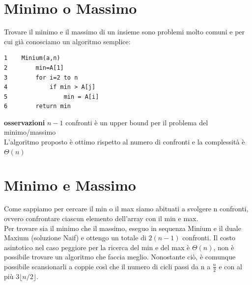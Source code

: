 \section{Minimo o Massimo}
Trovare il minimo e il massimo di un insieme sono problemi molto comuni e per cui già conosciamo un algoritmo semplice: 
\begin{verbatim}
1    Minium(a,n)
2        min=A[1]
3        for i=2 to n
4            if min > A[j]
5                min = A[i]
6        return min
\end{verbatim}
\textbf{osservazioni}
$n-1$ confronti è un upper bound per il problema del minimo/massimo\\
L'algoritmo proposto è ottimo rispetto al numero di confronti e la complessità è $\Theta(n)$

\section{Minimo e Massimo}
Come sappiamo per cercare il min o il max siamo abituati a svolgere n confronti, ovvero confrontare ciascun elemento dell'array con il min e max.  \\ 
Per trovare sia il minimo che il massimo, eseguo in sequenza Minium e il duale Maxium (soluzione Naif) e ottengo un totale di $2(n-1)$ confronti.
Il costo asintotico nel caso peggiore per la ricerca del min e del max è $\Theta(n)$, non è possibile trovare un algoritmo che faccia meglio. Nonostante ciò, è comunque possibile scansionarli a coppie così che il numero di cicli passi da n a $\frac{n}{2}$ e con al più $3 \lfloor n/2 \rfloor $.\\
